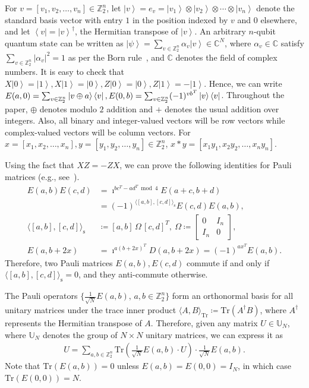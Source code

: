 \documentclass[twoside,romanappendices]{IEEEtran}
\newcommand{\ket}[1]{\left\lvert #1 \right\rangle}
\newcommand{\bra}[1]{\left\langle #1 \right\rvert}
\newcommand{\syminn}[2]{\langle #1, #2 \rangle_{\text{s}}}
\begin{document}
For $v = [v_1, v_2, \ldots, v_n] \in \mathbb{Z}_2^n$, let $\ket{v} = e_v = \ket{v_1} \otimes \ket{v_2} \otimes \cdots \otimes \ket{v_n}$ denote the standard basis vector with entry $1$ in the position indexed by $v$ and $0$ elsewhere, and let $\bra{v} = \ket{v}^{\dagger}$, the Hermitian transpose of $\ket{v}$.
An arbitrary $n$-qubit quantum state can be written as $\ket{\psi} = \sum_{v \in \mathbb{Z}_2^n} \alpha_v \ket{v} \in \mathbb{C}^N$, where $\alpha_v \in \mathbb{C}$ satisfy $\sum_{v \in \mathbb{Z}_2^n} | \alpha_v |^2 = 1$ as per the Born rule~\cite{Wilde-2013}, and $\mathbb{C}$ denotes the field of complex numbers.
It is easy to check that $X \ket{0} = \ket{1}, X \ket{1} = \ket{0}, Z \ket{0} = \ket{0}, Z \ket{1} = - \ket{1}$.
Hence, we can write $E(a,0) = \sum_{v \in \mathbb{Z}_2^n} \ketbra{v \oplus a}{v}, E(0,b) = \sum_{v \in \mathbb{Z}_2^n} (-1)^{vb^T} \ketbra{v}$.
Throughout the paper, $\oplus$ denotes modulo $2$ addition and $+$ denotes the usual addition over integers.
Also, all binary and integer-valued vectors will be row vectors while complex-valued vectors will be column vectors.
For $x = [x_1,x_2,\ldots,x_n] ,y = [y_1,y_2,\ldots,y_n] \in \mathbb{Z}_2^n$, $x \ast y = [x_1 y_1, x_2 y_2, \ldots, x_n y_n]$. 


Using the fact that $XZ = -ZX$, we can prove the following identities for Pauli matrices (e.g., see~\cite{Rengaswamy-arxiv18}).
\begin{align}
\label{eq:Eab_multiply}
E(a,b) E(c,d) & = \imath^{bc^T - ad^T \bmod 4} E(a+c, b+d) \nonumber \\
%
  & = (-1)^{\syminn{[a,b]}{[c,d]}} E(c,d) E(a,b), \\
%
\syminn{[a,b]}{[c,d]} & \coloneqq [a,b] \, \Omega\, [c,d]^T, \ \Omega \coloneqq 
\begin{bmatrix}
0 & I_n \\
I_n & 0
\end{bmatrix}, \\
%
\label{eq:Eab_2x}
E(a, b + 2x) & = \imath^{a(b+2x)^T} D(a,b + 2x) = %
 (-1)^{ax^T} E(a,b).
\end{align}
Therefore, two Pauli matrices $E(a,b), E(c,d)$ commute if and only if $\syminn{[a,b]}{[c,d]} = 0$, and they anti-commute otherwise.

The Pauli operators $\{ \frac{1}{\sqrt{N}} E(a,b),\, a,b \in \mathbb{Z}_2^n \}$ form an orthonormal basis for all unitary matrices under the trace inner product $\langle A,B \rangle_{\text{Tr}} \coloneqq \text{Tr}(A^{\dagger} B)$, where $A^{\dagger}$ represents the Hermitian transpose of $A$.
Therefore, given any matrix $U \in \mathbb{U}_N$, where $\mathbb{U}_N$ denotes the group of $N \times N$ unitary matrices, we can express it as
\begin{align}
U = \sum_{a,b \in \mathbb{Z}_2^n} \text{Tr}\left( \frac{1}{\sqrt{N}} E(a,b) \cdot U \right) \cdot \frac{1}{\sqrt{N}} E(a,b). 
\end{align}
Note that $\text{Tr}(E(a,b)) = 0$ unless $E(a,b) = E(0,0) = I_N$, in which case $\text{Tr}(E(0,0)) = N$.
\end{document}
